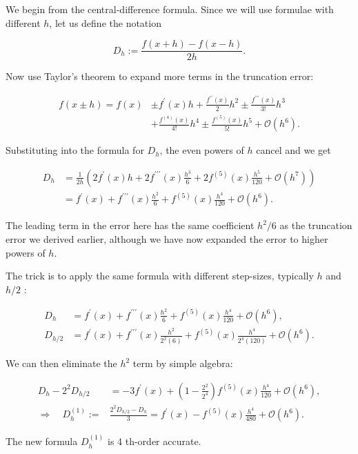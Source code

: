 \begin{remark}
  We begin from the central-difference formula. Since we will use formulae with different \(h\), let us define the notation

\[
D_h:=\frac{f(x+h)-f(x-h)}{2 h} .
\]

Now use Taylor's theorem to expand more terms in the truncation error:

\[
\begin{aligned}
f(x \pm h)=f(x) & \pm f^{\prime}(x) h+\frac{f^{\prime \prime}(x)}{2} h^2 \pm \frac{f^{\prime \prime \prime}(x)}{3!} h^3 \\
& +\frac{f^{(4)}(x)}{4!} h^4 \pm \frac{f^{(5)}(x)}{5!} h^5+\mathcal{O}\left(h^6\right) .
\end{aligned}
\]

Substituting into the formula for \(D_h\), the even powers of \(h\) cancel and we get

\[
\begin{aligned}
D_h & =\frac{1}{2 h}\left(2 f^{\prime}(x) h+2 f^{\prime \prime \prime}(x) \frac{h^3}{6}+2 f^{(5)}(x) \frac{h^5}{120}+\mathcal{O}\left(h^7\right)\right) \\
& =f^{\prime}(x)+f^{\prime \prime \prime}(x) \frac{h^2}{6}+f^{(5)}(x) \frac{h^4}{120}+\mathcal{O}\left(h^6\right) .
\end{aligned}
\]

The leading term in the error here has the same coefficient \(h^2 / 6\) as the truncation error we derived earlier, although we have now expanded the error to higher powers of \(h\).

The trick is to apply the same formula with different step-sizes, typically \(h\) and \(h / 2\) :

\[
\begin{aligned}
D_h & =f^{\prime}(x)+f^{\prime \prime \prime}(x) \frac{h^2}{6}+f^{(5)}(x) \frac{h^4}{120}+\mathcal{O}\left(h^6\right), \\
D_{h / 2} & =f^{\prime}(x)+f^{\prime \prime \prime}(x) \frac{h^2}{2^2(6)}+f^{(5)}(x) \frac{h^4}{2^4(120)}+\mathcal{O}\left(h^6\right) .
\end{aligned}
\]

We can then eliminate the \(h^2\) term by simple algebra:

\[
\begin{aligned}
D_h-2^2 D_{h / 2} & =-3 f^{\prime}(x)+\left(1-\frac{2^2}{2^4}\right) f^{(5)}(x) \frac{h^4}{120}+\mathcal{O}\left(h^6\right), \\
\Longrightarrow \quad D_h^{(1)}:= & \frac{2^2 D_{h / 2}-D_h}{3}=f^{\prime}(x)-f^{(5)}(x) \frac{h^4}{480}+\mathcal{O}\left(h^6\right) .
\end{aligned}
\]

The new formula \(D_h^{(1)}\) is 4 th-order accurate.

\end{remark}

